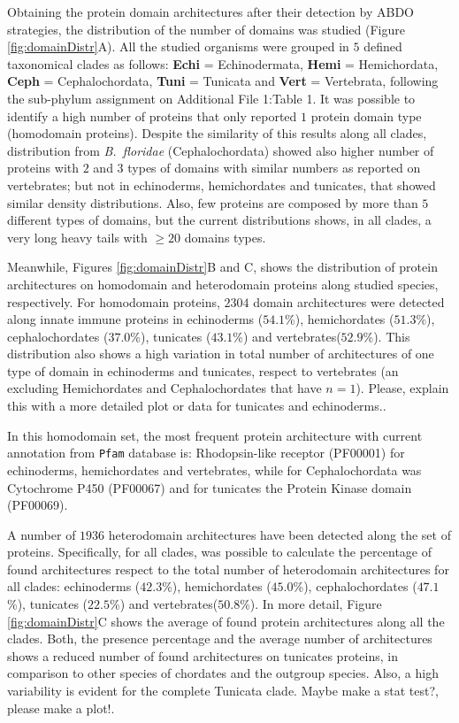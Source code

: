 \documentclass[11pt]{article}
\newcommand{\TODO}[1]{\begingroup\color{red}#1\endgroup}
\begin{document}
Obtaining the protein domain architectures after their detection by ABDO 
strategies, the distribution of the number of domains was studied (Figure 
\ref{fig:domainDistr}A). All the studied organisms were grouped in $5$ 
defined taxonomical clades as follows: \textbf{Echi} = Echinodermata, 
\textbf{Hemi} = Hemichordata, \textbf{Ceph} = Cephalochordata, \textbf{Tuni} = 
Tunicata and \textbf{Vert} = Vertebrata, following the sub-phylum assignment on 
Additional File 1:Table 1. It was possible to identify a high number of 
proteins that only reported $1$ protein domain type (homodomain proteins).
Despite the similarity of this results along all clades, distribution 
from \textsl{B.\ floridae} (Cephalochordata) showed also higher number of 
proteins with $2$ and $3$ types of domains with similar numbers as reported 
on vertebrates; but not in echinoderms, hemichordates and tunicates, that 
showed similar density distributions. Also, few proteins are composed by more 
than $5$ different types of domains, but the current distributions shows, in 
all clades, a very long heavy tails with \TODO{$\ge 20$ domains types}.

Meanwhile, Figures \ref{fig:domainDistr}B and C, shows the distribution of 
protein architectures on homodomain and heterodomain proteins along studied 
species, respectively. For homodomain proteins, $2304$ domain architectures 
were detected along innate immune proteins in echinoderms ($54.1$\%), 
hemichordates ($51.3$\%), cephalochordates ($37.0$\%), tunicates ($43.1$\%) and 
vertebrates($52.9$\%). This distribution also shows a high variation in 
total number of architectures of one type of domain in echinoderms and 
tunicates, respect to vertebrates (an excluding Hemichordates and 
Cephalochordates that have $n=1$). \TODO{Please, explain this with a more 
detailed plot or data for tunicates and echinoderms.}.

In this homodomain set, the most frequent protein architecture with 
current annotation from \texttt{Pfam} database is: Rhodopsin-like receptor 
(PF00001) for echinoderms, hemichordates and vertebrates, while for 
Cephalochordata was Cytochrome P450 (PF00067) and for tunicates the Protein 
Kinase domain (PF00069). 

A number of $1936$ heterodomain architectures have been detected along the set 
of proteins. Specifically, for all clades, was possible to calculate 
the percentage of found architectures respect to the total number of 
heterodomain architectures for all clades: echinoderms ($42.3$\%), 
hemichordates ($45.0$\%), cephalochordates ($47.1$\%), tunicates 
($22.5$\%) and vertebrates($50.8$\%). In more detail, 
Figure \ref{fig:domainDistr}C shows the average of found protein architectures 
along all the clades. Both, the presence percentage and the average number of 
architectures shows a reduced number of found architectures on tunicates 
proteins, in comparison to other species of chordates and the outgroup species. 
Also, a high variability is evident for the complete Tunicata clade. \TODO{Maybe 
make a stat test?, please make a plot!}.  
\end{document}
